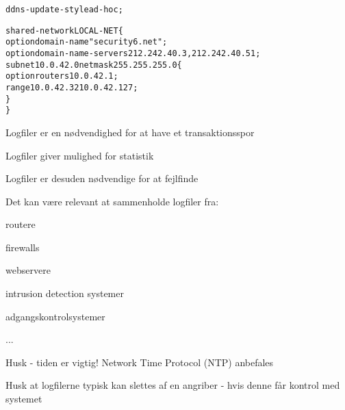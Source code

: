 \documentclass[Screen16to9,17pt,footrule]{foils}
\begin{document}
\begin{alltt}
\small
ddns-update-style ad-hoc;

shared-network LOCAL-NET \{
    option  domain-name "security6.net";
    option  domain-name-servers 212.242.40.3, 212.242.40.51;
    subnet 10.0.42.0 netmask 255.255.255.0 \{
            option routers 10.0.42.1;
            range 10.0.42.32 10.0.42.127;
    \}
\}
\end{alltt}






\begin{list1}
\item Logfiler er en nødvendighed for at have et transaktionsspor
\item Logfiler giver mulighed for statistik
\item Logfiler er desuden nødvendige for at fejlfinde
\item Det kan være relevant at sammenholde logfiler fra:
\begin{list2}
\item routere
\item firewalls
\item webservere
\item intrusion detection systemer
\item adgangskontrolsystemer
\item ...
\end{list2}
\item Husk - tiden er vigtig! Network Time Protocol (NTP) anbefales
\item Husk at logfilerne typisk kan slettes af en angriber -
  hvis denne får kontrol med systemet
\end{list1}
\end{document}
